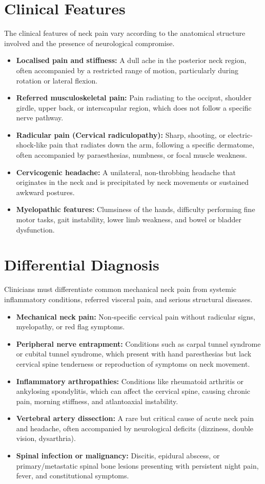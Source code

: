 \section*{Clinical Features}
The clinical features of neck pain vary according to the anatomical structure involved and the presence of neurological compromise.
\begin{itemize}
    \item \textbf{Localised pain and stiffness:} A dull ache in the posterior neck region, often accompanied by a restricted range of motion, particularly during rotation or lateral flexion.
    \item \textbf{Referred musculoskeletal pain:} Pain radiating to the occiput, shoulder girdle, upper back, or interscapular region, which does not follow a specific nerve pathway.
    \item \textbf{Radicular pain (Cervical radiculopathy):} Sharp, shooting, or electric-shock-like pain that radiates down the arm, following a specific dermatome, often accompanied by paraesthesias, numbness, or focal muscle weakness.
    \item \textbf{Cervicogenic headache:} A unilateral, non-throbbing headache that originates in the neck and is precipitated by neck movements or sustained awkward postures.
    \item \textbf{Myelopathic features:} Clumsiness of the hands, difficulty performing fine motor tasks, gait instability, lower limb weakness, and bowel or bladder dysfunction.
\end{itemize}

\section*{Differential Diagnosis}
Clinicians must differentiate common mechanical neck pain from systemic inflammatory conditions, referred visceral pain, and serious structural diseases.
\begin{itemize}
    \item \textbf{Mechanical neck pain:} Non-specific cervical pain without radicular signs, myelopathy, or red flag symptoms.
    \item \textbf{Peripheral nerve entrapment:} Conditions such as carpal tunnel syndrome or cubital tunnel syndrome, which present with hand paresthesias but lack cervical spine tenderness or reproduction of symptoms on neck movement.
    \item \textbf{Inflammatory arthropathies:} Conditions like rheumatoid arthritis or ankylosing spondylitis, which can affect the cervical spine, causing chronic pain, morning stiffness, and atlantoaxial instability.
    \item \textbf{Vertebral artery dissection:} A rare but critical cause of acute neck pain and headache, often accompanied by neurological deficits (dizziness, double vision, dysarthria).
    \item \textbf{Spinal infection or malignancy:} Discitis, epidural abscess, or primary/metastatic spinal bone lesions presenting with persistent night pain, fever, and constitutional symptoms.
\end{itemize}

